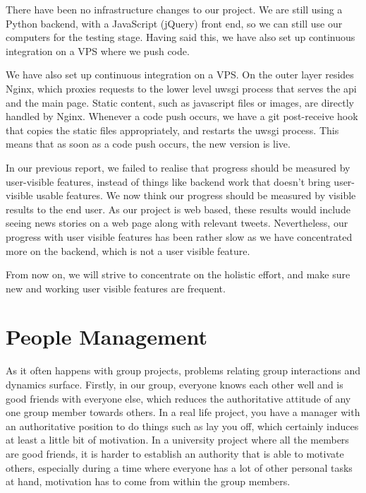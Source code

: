 \documentclass[a4paper,12pt]{article}
\begin{document}
  There have been no infrastructure changes to our project. We are still using a Python backend, with a JavaScript (jQuery) front end, so we can still use our computers for the testing stage. Having said this, we have also set up continuous integration on a VPS where we push code.

	We have also set up continuous integration on a VPS. On the outer layer resides Nginx, which proxies requests to the lower level uwsgi process that serves the api and the main page. Static content, such as javascript files or images, are directly handled by Nginx. Whenever a code push occurs, we have a git post-receive hook that copies the static files appropriately, and restarts the uwsgi process. This means that as soon as a code push occurs, the new version is live.
  
	In our previous report, we failed to realise that progress should be measured by user-visible features, instead of things like backend work that doesn't bring user-visible usable features. We now think our progress should be measured by visible results to the end user. As our project is web based, these results would include seeing news stories on a web page along with relevant tweets. Nevertheless, our progress with user visible features has been rather slow as we have concentrated more on the backend, which is not a user visible feature.

	From now on, we will strive to concentrate on the holistic effort, and make sure new and working user visible features are frequent.
	
	
	\section{People Management}
	
	As it often happens with group projects, problems relating group interactions and dynamics surface. Firstly, in our group, everyone knows each other well and is good friends with everyone else, which reduces the authoritative attitude of any one group member towards others. In a real life project, you have a manager with an authoritative position to do things such as lay you off, which certainly induces at least a little bit of motivation. In a university project where all the members are good friends, it is harder to establish an authority that is able to motivate others, especially during a time where everyone has a lot of other personal tasks at hand, motivation has to come from within the group members.
	
\end{document}
